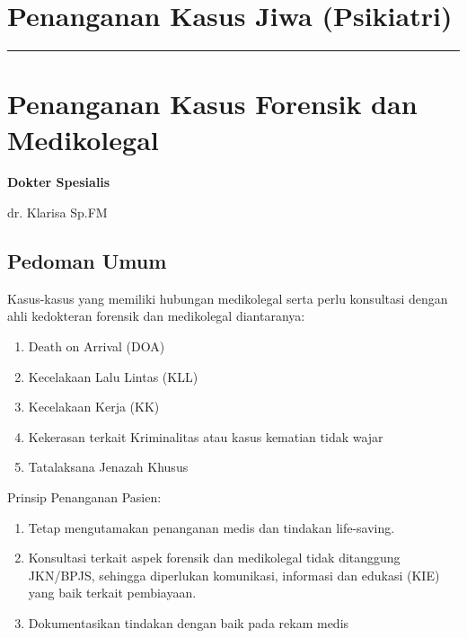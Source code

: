 \documentclass[
]{book}
\begin{document}
\hypertarget{penanganan-kasus-jiwa-psikiatri}{%
\section{Penanganan Kasus Jiwa (Psikiatri)}\label{penanganan-kasus-jiwa-psikiatri}}

\begin{center}\rule{0.5\linewidth}{0.5pt}\end{center}

\hypertarget{penanganan-kasus-forensik-dan-medikolegal}{%
\section{Penanganan Kasus Forensik dan Medikolegal}\label{penanganan-kasus-forensik-dan-medikolegal}}

\textbf{Dokter Spesialis}

dr. Klarisa Sp.FM

\hypertarget{pedoman-umum-10}{%
\subsection{Pedoman Umum}\label{pedoman-umum-10}}

Kasus-kasus yang memiliki hubungan medikolegal serta perlu konsultasi dengan ahli kedokteran forensik dan medikolegal diantaranya:

\begin{enumerate}
\def\labelenumi{\arabic{enumi}.}
\item
  Death on Arrival (DOA)
\item
  Kecelakaan Lalu Lintas (KLL)
\item
  Kecelakaan Kerja (KK)
\item
  Kekerasan terkait Kriminalitas atau kasus kematian tidak wajar
\item
  Tatalaksana Jenazah Khusus
\end{enumerate}

Prinsip Penanganan Pasien:

\begin{enumerate}
\def\labelenumi{\arabic{enumi}.}
\item
  Tetap mengutamakan penanganan medis dan tindakan life-saving.
\item
  Konsultasi terkait aspek forensik dan medikolegal tidak ditanggung JKN/BPJS, sehingga diperlukan komunikasi, informasi dan edukasi (KIE) yang baik terkait pembiayaan.
\item
  Dokumentasikan tindakan dengan baik pada rekam medis
\end{enumerate}
\end{document}
